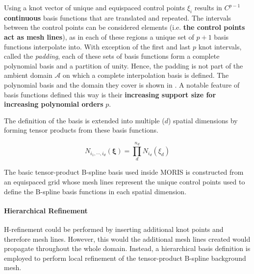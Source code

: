 Using a knot vector of unique and equispaced control points $\xi_i$ results in \textbf{$C^{p-1}$ continuous} basis functions that are translated and repeated. The intervals between the control points can be considered elements (i.e. \textbf{the control points act as mesh lines}), as in each of these regions a unique set of $p+1$ basis functions interpolate into. With exception of the first and last $p$ knot intervals, called the \emph{padding}, each of these sets of basis functions form a complete polynomial basis and a partition of unity. Hence, the padding is not part of the ambient domain $\mathcal{A}$ on which a complete interpolation basis is defined. The polynomial basis and the domain they cover is shown in . A notable feature of basis functions defined this way is their \textbf{increasing support size for increasing polynomial orders} $p$.

The definition of the basis is extended into multiple ($d$) spatial dimensions by forming tensor products from these basis functions.

\begin{equation}
\label{eqn:tensor_product}
    N_{i_1, \cdots, i_d}(\bm{\xi}) = \prod_{d}^{n_d}N_{i_d}(\xi_d)
\end{equation}

The basic tensor-product B-spline basis used inside MORIS is constructed from an equispaced grid whose mesh lines represent the unique control points used to define the B-spline basis functions in each spatial dimension.

\paragraph{Hierarchical Refinement}
\hypertarget{hierarchical_refinement}{}

H-refinement could be performed by inserting additional knot points and therefore mesh lines. However, this would the additional mesh lines created would propagate throughout the whole domain.
Instead, a hierarchical basis definition is employed to perform local refinement of the tensor-product B-spline background mesh.


